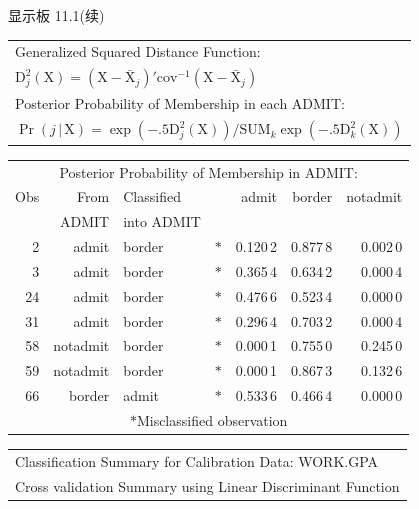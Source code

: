 
显示板 11.1(续)

\begin{mvbox}
{\ttfamily\small
\begin{center}
\begin{tabular}{@{}l@{}}
Generalized Squared Distance Function:\\
$\mathrm{D}_j^2(\mathrm{X})=(\mathrm{X}-\bar{\mathrm{X}}_j)'\mathrm{cov}^{-1}(\mathrm{X}-\bar{\mathrm{X}}_j)$\\
Posterior Probability of Membership in each ADMIT:\\
$\Pr(j\,|\,\mathrm{X})=\exp(-.5\mathrm{D}_j^2(\mathrm{X}))/\mathrm{SUM}_k\exp(-.5\mathrm{D}_k^2(\mathrm{X}))$
\end{tabular}
\end{center}

\begin{center}
\begin{tabular}{@{}rrlcrrr@{}}
\multicolumn{7}{c}{Posterior Probability of Membership in ADMIT:}\\
Obs & From & Classified & & admit & border & notadmit\\
 & ADMIT & into ADMIT & & & &\\
2 & admit & border & $*$ & 0.120\,2 & 0.877\,8 & 0.002\,0\\
3 & admit & border & $*$ & 0.365\,4 & 0.634\,2 & 0.000\,4\\
24 & admit & border & $*$ & 0.476\,6 & 0.523\,4 & 0.000\,0\\
31 & admit & border & $*$ & 0.296\,4 & 0.703\,2 & 0.000\,4\\
58 & notadmit & border & $*$ & 0.000\,1 & 0.755\,0 & 0.245\,0\\
59 & notadmit & border & $*$ & 0.000\,1 & 0.867\,3 & 0.132\,6\\
66 & border & admit & $*$ & 0.533\,6 & 0.466\,4 & 0.000\,0\\
\multicolumn{7}{c}{$*$Misclassified observation}
\end{tabular}
\end{center}

\begin{center}
\begin{tabular}{|l|}
\hline
Classification Summary for Calibration Data: WORK.GPA\\
Cross validation Summary using Linear Discriminant Function\\
\hline
\end{tabular}
\end{center}

}
\end{mvbox}
